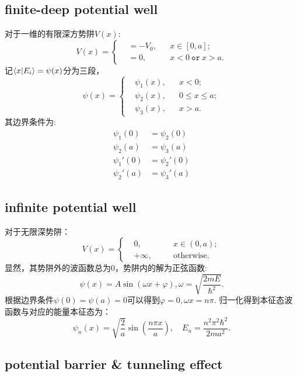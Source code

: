 \subsection{finite-deep potential well}
对于一维的有限深方势阱$V(x)$:
\begin{equation}
    V(x)=\left\lbrace\begin{aligned}
        &=-V_0, && x\in[0,a];\\
        &=0, && x <0 \ \mathtt{or}\  x>a.
    \end{aligned}\right.
\end{equation}
记$\left<x\middle|E_i\right>=\psi(x)$分为三段，
\begin{equation}
    \psi(x)=\left\lbrace\begin{aligned}
        &\psi_1(x),&&x<0;\\
        &\psi_2(x),&&0\leq x\leq a;\\
        &\psi_3(x),&&x>a.
    \end{aligned}\right.
\end{equation}
其边界条件为: 
\begin{align}
    \psi_1(0)&=\psi_2(0)\\
    \psi_2(a)&=\psi_3(a)\\
    \psi_1'(0)&=\psi_2'(0)\\
    \psi_2'(a)&=\psi_3'(a)
\end{align}
\subsection{infinite potential well}
对于无限深势阱：
\begin{equation}
    V(x)=\left\lbrace
    \begin{aligned}
        &0, \quad && x\in(0,a);\\
        &+\infty, \quad && \text{otherwise.}
    \end{aligned}\right.
\end{equation}
显然，其势阱外的波函数总为0，势阱内的解为正弦函数:
\begin{equation}
    \psi(x)=A\sin(\omega x+\varphi), \omega=\sqrt{\frac{2mE}{\hbar^2}}.
\end{equation}
根据边界条件$\psi(0)=\psi(a)=0$可以得到$\varphi=0, \omega x=n\pi$.
归一化得到本征态波函数与对应的能量本征态为：
\begin{equation}
    \psi_n(x)=\sqrt{\frac{2}{a}}\sin\left(\frac{n\pi x}{a}\right), \quad E_n=\frac{n^2\pi^2\hbar^2}{2ma^2}.
\end{equation}
\subsection{potential barrier \& tunneling effect}
